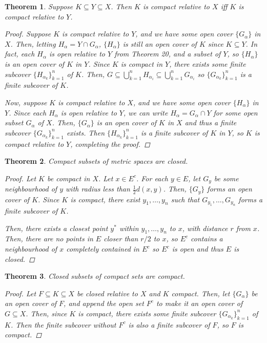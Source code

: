 \documentclass{scrbook}
\newtheorem{theorem}{Theorem}
\begin{document}
\begin{theorem}
Suppose $K \subseteq Y \subseteq X$. Then $K$ is compact relative to $X$ iff $K$ is compact relative to $Y$.

\begin{proof}
Suppose $K$ is compact relative to $Y$, and we have some open cover $\{G_\alpha\}$ in $X$. Then, letting $H_\alpha = Y \cap G_\alpha$, $\{H_\alpha\}$ is still an open cover of $K$ since $K \subseteq Y$. In fact, each $H_\alpha$ is open relative to $Y$ from Theorem 20, and a subset of $Y$, so $\{H_\alpha\}$ is an open cover of $K$ in $Y$. Since $K$ is compact in $Y$, there exists some finite subcover $\{H_{\alpha_k}\}_{k=1}^{n}$ of $K$. Then, $G \subseteq \bigcup_{k=1}^{n} H_{\alpha_i} \subseteq \bigcup_{k=1}^{n} G_{\alpha_i}$ so $\{G_{\alpha_k}\}_{k=1}^{n}$ is a finite subcover of $K$. 

Now, suppose $K$ is compact relative to $X$, and we have some open cover $\{H_\alpha\}$ in $Y$. Since each $H_\alpha$ is open relative to $Y$, we can write $H_\alpha = G_\alpha \cap Y$ for some open subset $G_\alpha$ of $X$. Then, $\{G_\alpha\}$ is an open cover of $K$ in $X$ and thus a finite subcover $\{G_{\alpha_k}\}_{k=1}^{n}$ exists. Then $\{H_{\alpha_k}\}_{k=1}^{n}$ is a finite subcover of $K$ in $Y$, so $K$ is compact relative to $Y$, completing the proof.
\end{proof}
\end{theorem}

\begin{theorem}
Compact subsets of metric spaces are closed.

\begin{proof}
Let $K$ be compact in $X$. Let $x \in E^c$. For each $y \in E$, let $G_y$ be some neighbourhood of $y$ with radius less than $\frac12 d(x, y)$. Then, $\{G_y\}$ forms an open cover of $K$. Since $K$ is compact, there exist $y_1, \dotsc, y_n$ such that $G_{y_1}, \dotsc, G_{y_n}$ forms a finite subcover of $K$. 

Then, there exists a closest point $y^*$ within $y_1, \dotsc, y_n$ to $x$, with distance $r$ from $x$. Then, there are no points in $E$ closer than $r/2$ to $x$, so $E^c$ contains a neighbourhood of $x$ completely contained in $E^c$ so $E^c$ is open and thus $E$ is closed.
\end{proof}
\end{theorem}

\begin{theorem}
Closed subsets of compact sets are compact.

\begin{proof}
Let $F \subseteq K \subseteq X$ be closed relative to $X$ and $K$ compact. Then, let $\{G_\alpha\}$ be an open cover of $F$, and append the open set $F^c$ to make it an open cover of $G \subseteq X$. Then, since $K$ is compact, there exists some finite subcover $\{G_{\alpha_k}\}_{k=1}^{n}$ of $K$. Then the finite subcover without $F^c$ is also a finite subcover of $F$, so $F$ is compact.
\end{proof}
\end{theorem}
\end{document}
